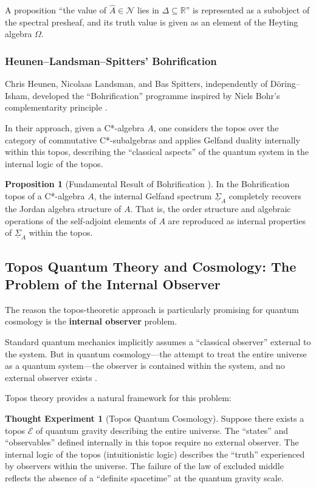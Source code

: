 \documentclass[12pt,a4paper]{article}
\theoremstyle{definition}
\newtheorem{proposition}[definition]{Proposition}
\newtheorem{thought}[definition]{Thought Experiment}
\begin{document}
A proposition ``the value of $\hat{A} \in \mathcal{N}$ lies in $\Delta \subseteq \mathbb{R}$'' is represented as a subobject of the spectral presheaf, and its truth value is given as an element of the Heyting algebra $\Omega$.

\subsubsection{Heunen--Landsman--Spitters' Bohrification}

Chris Heunen, Nicolaas Landsman, and Bas Spitters, independently of D\"{o}ring--Isham, developed the ``Bohrification'' programme inspired by Niels Bohr's complementarity principle \cite{HeunenLandsmanSpitters2009}.

In their approach, given a C*-algebra $A$, one considers the topos over the category of commutative C*-subalgebras and applies Gelfand duality internally within this topos, describing the ``classical aspects'' of the quantum system in the internal logic of the topos.

\begin{proposition}[Fundamental Result of Bohrification \cite{HeunenLandsmanSpitters2009}]
In the Bohrification topos of a C*-algebra $A$, the internal Gelfand spectrum $\underline{\Sigma}_A$ completely recovers the Jordan algebra structure of $A$. That is, the order structure and algebraic operations of the self-adjoint elements of $A$ are reproduced as internal properties of $\underline{\Sigma}_A$ within the topos.
\end{proposition}

\subsection{Topos Quantum Theory and Cosmology: The Problem of the Internal Observer}

The reason the topos-theoretic approach is particularly promising for quantum cosmology is the \textbf{internal observer} problem.

Standard quantum mechanics implicitly assumes a ``classical observer'' external to the system. But in quantum cosmology---the attempt to treat the entire universe as a quantum system---the observer is contained within the system, and no external observer exists \cite{DeWitt1967, Hartle1995}.

Topos theory provides a natural framework for this problem:

\begin{thought}[Topos Quantum Cosmology]
Suppose there exists a topos $\mathcal{E}$ of quantum gravity describing the entire universe. The ``states'' and ``observables'' defined internally in this topos require no external observer. The internal logic of the topos (intuitionistic logic) describes the ``truth'' experienced by observers within the universe. The failure of the law of excluded middle reflects the absence of a ``definite spacetime'' at the quantum gravity scale.
\end{thought}
\end{document}
